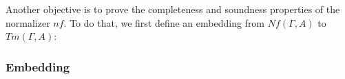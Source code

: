 Another objective is to prove the completeness and soundness properties of the normalizer $nf$. To do that, we first define an embedding from $Nf(\Gamma,A)$ to $Tm(\Gamma,A)$:

\begin{code}[hide]%
\>[0]\<%
\end{code}

\subsubsection*{Embedding}

\begin{code}%
\>[0][@{}l@{\AgdaIndent{1}}]%
\>[2]\AgdaSpace{}%
\AgdaSymbol{:}\AgdaSpace{}%
\AgdaSpace{}%
\AgdaSpace{}%
\AgdaSpace{}%
\AgdaSpace{}%
\AgdaSpace{}%
\AgdaSpace{}%
\<%
\\
%
\>[2]\AgdaSpace{}%
\AgdaSymbol{(}\AgdaSpace{}%
\AgdaSymbol{)}\AgdaSpace{}%
\AgdaSymbol{=}\AgdaSpace{}%
\AgdaSpace{}%
\AgdaSymbol{(}\AgdaSpace{}%
\AgdaSymbol{)}\<%
\\
%
\>[2]\AgdaSpace{}%
\AgdaSymbol{(}\AgdaSpace{}%
\AgdaSymbol{)}\AgdaSpace{}%
\AgdaSymbol{=}\AgdaSpace{}%
\AgdaSpace{}%
\<%
\\
%
\\[\AgdaEmptyExtraSkip]%
%
\>[2]\AgdaSpace{}%
\AgdaSymbol{:}\AgdaSpace{}%
\AgdaSpace{}%
\AgdaSpace{}%
\AgdaSpace{}%
\AgdaSpace{}%
\AgdaSpace{}%
\AgdaSpace{}%
\<%
\\
%
\>[2]\AgdaSpace{}%
\AgdaSymbol{(}\AgdaSpace{}%
\AgdaSpace{}%
\AgdaSpace{}%
\AgdaSpace{}%
\AgdaSymbol{)}\AgdaSpace{}%
\AgdaSymbol{=}\AgdaSpace{}%
\AgdaFunction{Σtm[}\AgdaSpace{}%
\AgdaSpace{}%
\AgdaSpace{}%
\AgdaSpace{}%
\AgdaFunction{]}\<%
\\
\>[2][@{}l@{\AgdaIndent{0}}]%
\>[4]\AgdaFunction{Πtm[}\AgdaSpace{}%
\AgdaSpace{}%

\end{code}
